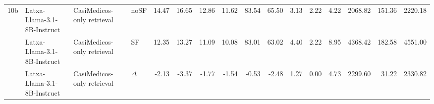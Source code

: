 \begin{landscape}
\begin{footnotesize}
\begin{longtable}{l l l l r r r r r r r r r r r r}
10b & Latxa-Llama-3.1-8B-Instruct & CasiMedicos-only retrieval & noSF & 14.47 & 16.65 & 12.86 & 11.62 & 83.54 & 65.50 & 3.13 & 2.22 & 4.22 & 2068.82 & 151.36 & 2220.18 \\
 & Latxa-Llama-3.1-8B-Instruct & CasiMedicos-only retrieval & SF & 12.35 & 13.27 & 11.09 & 10.08 & 83.01 & 63.02 & 4.40 & 2.22 & 8.95 & 4368.42 & 182.58 & 4551.00 \\
 & Latxa-Llama-3.1-8B-Instruct & CasiMedicos-only retrieval & $\Delta$ & -2.13 & -3.37 & -1.77 & -1.54 & -0.53 & -2.48 & 1.27 & 0.00 & 4.73 & 2299.60 & 31.22 & 2330.82 \\
\end{longtable}
\end{footnotesize}
\end{landscape}
